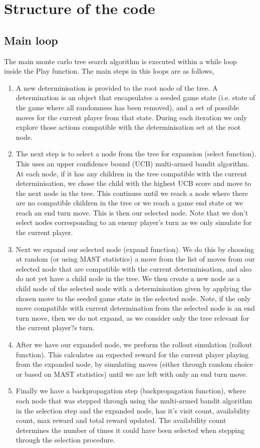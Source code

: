 \documentclass[a4paper,10pt]{article}
\begin{document}
\section{Structure of the code}

\subsection{Main loop}
The main monte carlo tree search algorithm is executed within a while loop inside the Play function. The main steps in this loops are as follows,
\begin{enumerate}
\item A new determinisation is provided to the root node of the tree. A determination is an object that encapsulates a seeded game state (i.e. state of the game where all randomness has been removed), and a set of possible moves for the current player from that state.  During each iteration we only explore those actions compatible with the determinisation set at the root node. 
\item The next step is to select a node from the tree for expansion (select function). This uses an upper confidence bound (UCB) multi-armed bandit algorithm. At each node, if it has any children in the tree compatible with the current determinisation, we chose the child with the highest UCB score and move to the next node in the tree. This continues until we reach a node where there are no compatible children in the tree or we reach a game end state or we reach an end turn move. This is then our selected node. Note that we don't select nodes corresponding to an enemy player's turn as we only simulate for the current player.
\item Next we expand our selected node (expand function). We do this by choosing at random (or using MAST statistics) a move from the list of moves from our selected node that are compatible with the current determinisation, and also do not yet have a child node in the tree. We then create a new node as a child node of the selected node with a determinisation given by applying the chosen move to the seeded game state in the selected node. Note, if the only move compatible with current determination from the selected node is an end turn move, then we do not expand, as we consider only the tree relevant for the current player?s turn.
\item After we have our expanded node, we preform the rollout simulation (rollout function). This calculates an expected reward for the current player playing from the expanded node, by simulating moves (either through random choice or based on MAST statistics) until we are left with only an end turn move. 
\item Finally we have a backpropagation step (backpropagation function), where each node that was stepped through using the multi-armed bandit algorithm in the selection step and the expanded node, has it's visit count, availability count, max reward and total reward updated. The availability count determines the number of times it could have been selected when stepping through the selection procedure.
\end{enumerate}
\end{document}
